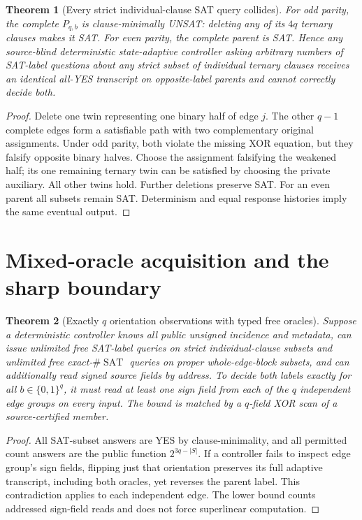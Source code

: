 \documentclass[11pt]{article}
\newtheorem{theorem}{Theorem}
\begin{document}
\begin{theorem}[Every strict individual-clause SAT query collides]
For odd parity, the complete $P_{q,b}$ is clause-minimally UNSAT: deleting any of its $4q$ ternary clauses makes it SAT. For even parity, the complete parent is SAT. Hence any source-blind deterministic state-adaptive controller asking arbitrary numbers of SAT-label questions about \emph{any strict subset} of individual ternary clauses receives an identical all-YES transcript on opposite-label parents and cannot correctly decide both.
\end{theorem}
\begin{proof}
Delete one twin representing one binary half of edge $j$. The other $q-1$ complete edges form a satisfiable path with two complementary original assignments. Under odd parity, both violate the missing XOR equation, but they falsify opposite binary halves. Choose the assignment falsifying the weakened half; its one remaining ternary twin can be satisfied by choosing the private auxiliary. All other twins hold. Further deletions preserve SAT. For an even parent all subsets remain SAT. Determinism and equal response histories imply the same eventual output.
\end{proof}
\section{Mixed-oracle acquisition and the sharp boundary}
\begin{theorem}[Exactly $q$ orientation observations with typed free oracles]
Suppose a deterministic controller knows all public unsigned incidence and metadata, can issue unlimited free SAT-label queries on strict individual-clause subsets and unlimited free exact-$\#\operatorname{SAT}$ queries on proper whole-edge-block subsets, and can additionally read signed source fields by address. To decide both labels exactly for all $b\in\{0,1\}^q$, it must read at least one sign field from each of the $q$ independent edge groups on every input. The bound is matched by a $q$-field XOR scan of a source-certified member.
\end{theorem}
\begin{proof}
All SAT-subset answers are YES by clause-minimality, and all permitted count answers are the public function $2^{3q-|S|}$. If a controller fails to inspect edge group's sign fields, flipping just that orientation preserves its full adaptive transcript, including both oracles, yet reverses the parent label. This contradiction applies to each independent edge. The lower bound counts addressed sign-field reads and does not force superlinear computation.
\end{proof}
\end{document}
